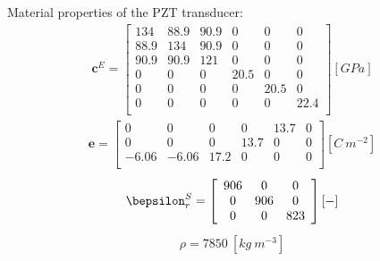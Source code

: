 \documentclass[a4paper,12pt]{article}
\begin{document}
Material properties of the PZT transducer:
\begin{eqnarray}
\textbf{c}^E=\left [ 
\begin{array}{cccccc}
134 & 88.9 & 90.9 & 0 & 0 & 0 \\ 
88.9 & 134 & 90.9 & 0 & 0 & 0 \\
90.9 & 90.9 & 121 & 0 & 0 & 0 \\
0 & 0 & 0 & 20.5 & 0 & 0 \\
0 & 0 & 0 & 0 & 20.5 & 0 \\
0 & 0 & 0 & 0 & 0 & 22.4 \nonumber \\
\end{array}
\right ] \left [ GPa \right ] 
\end{eqnarray}
\begin{eqnarray}
\textbf{e}=\left[
\begin{array}{cccccc}
0 & 0 & 0 & 0 & 13.7 & 0\\
0 & 0 & 0 & 13.7 & 0 & 0\\
-6.06 & -6.06 & 17.2 & 0 & 0 & 0\nonumber \\
\end{array}
\right] \left[C\ m^{-2}\right]
\end{eqnarray}
\begin{eqnarray}
\bepsilon^S_r=\left[
\begin{array}{ccc}
906 & 0 & 0\\
0 & 906 & 0\\
0 & 0 & 823\nonumber \\
\end{array}
\right] \left[ - \right]
\end{eqnarray}
\begin{eqnarray}
\rho=7850\ [kg\ m^{-3}] \nonumber
\end{eqnarray}

{}
\end{document}
